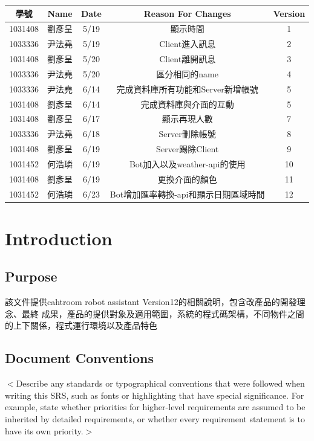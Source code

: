 \documentclass{scrreprt}
\begin{document}
\begin{CJK}{UTF8}{bkai}
	\begin{center}
    		\begin{tabular}{|c|c|c|c|c|}
        		\hline
	    	學號 & Name & Date & Reason For Changes & Version\\
        		\hline
	   	1031408 & 劉彥呈 & 5/19 & 顯示時間 & 1\\
        		\hline
	    	1033336 & 尹法堯 & 5/19 & Client進入訊息 & 2\\
        		\hline
		1031408 & 劉彥呈 & 5/20 & Client離開訊息 & 3\\
        		\hline
		1033336 & 尹法堯 & 5/20 & 區分相同的name & 4\\
        		\hline
		1033336 & 尹法堯 & 6/14 & 完成資料庫所有功能和Server新增帳號 & 5\\
		\hline
		1031408 & 劉彥呈 & 6/14 & 完成資料庫與介面的互動 & 5\\
        		\hline
		1031408 & 劉彥呈 & 6/17 & 顯示再現人數 & 7\\
        		\hline
		1033336 & 尹法堯 & 6/18 &  Server刪除帳號& 8\\
        		\hline
		1031408 & 劉彥呈 & 6/19 & Server踢除Client & 9\\
        		\hline
		1031452 & 何浩璘 & 6/19 & Bot加入以及weather-api的使用 & 10\\
        		\hline
		1031408 & 劉彥呈 & 6/19 & 更換介面的顏色 & 11\\
        		\hline
		1031452 & 何浩璘 & 6/23 & Bot增加匯率轉換-api和顯示日期區域時間 & 12\\
        		\hline
    		\end{tabular}
	\end{center}


\chapter{Introduction}

\section{Purpose}
該文件提供cahtroom robot assistant Version12的相關說明，包含改產品的開發理念、最終
成果，產品的提供對象及適用範圍，系統的程式碼架構，不同物件之間的上下關係，程式運行環境以及產品特色

\section{Document Conventions}
$<$Describe any standards or typographical conventions that were followed when 
writing this SRS, such as fonts or highlighting that have special significance.  
For example, state whether priorities  for higher-level requirements are assumed 
to be inherited by detailed requirements, or whether every requirement statement 
is to have its own priority.$>$


\end{CJK}
\end{document}
